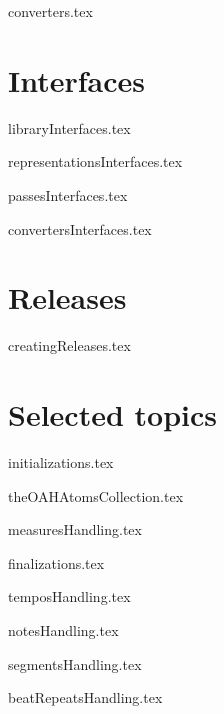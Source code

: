 \documentclass[11pt,a4paper]{report}
\begin{document}
{converters.tex}


\part{Interfaces}

{libraryInterfaces.tex}

{representationsInterfaces.tex}

{passesInterfaces.tex}

{convertersInterfaces.tex}


\part{Releases}

{creatingReleases.tex}


\part{Selected topics}


{initializations.tex}



{theOAHAtomsCollection.tex}



{measuresHandling.tex}

{finalizations.tex}

{temposHandling.tex}

{notesHandling.tex}

{segmentsHandling.tex}

{beatRepeatsHandling.tex}
\end{document}
